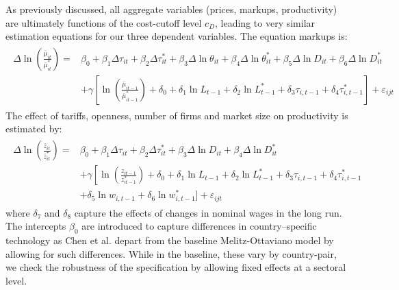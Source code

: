 \documentclass[a4paper,12pt]{article}
\begin{document}
As previously discussed, all aggregate variables (prices, markups, productivity) are ultimately functions of the cost-cutoff level $c_D$, leading to very similar estimation equations for our three dependent variables. The equation markups is:
\begin{align}
\begin{split}\label{eq:gw-estimation-markup}
\Delta \ln \left( \frac{\bar{\mu}_{it}}{\bar{\mu}_{it}^*} \right) = &\beta_0 + \beta_1 \Delta \tau_{it} + \beta_2 \Delta \tau_{it}^* + \beta_3 \Delta \ln \theta_{it} + \beta_4 \Delta \ln \theta_{it}^* + \beta_5 \Delta \ln D_{it} + \beta_6 \Delta \ln D_{it}^*\\ 
&+ \gamma \left[ \ln \left( \frac{\bar{\mu}_{it-1}}{\bar{\mu}_{it-1}^*} \right) + \delta_0 + \delta_1 \ln L_{t-1} + \delta_2\ln L_{t-1}^* + \delta_3  \tau_{i,t-1} + \delta_4  \tau_{i,t-1}^* \right] + \varepsilon_{ijt} 
\end{split}
\end{align}
The effect of tariffs, openness, number of firms and market size on productivity is estimated by:
\begin{align}
\begin{split}\label{eq:gw-estimation-productivity}
\Delta \ln \left( \frac{\bar{z}_{it}}{\bar{z}_{it}^*} \right) =&\beta_0 + \beta_1 \Delta \tau_{it} + \beta_2 \Delta \tau_{it}^*  + \beta_3 \Delta \ln D_{it} + \beta_4 \Delta \ln D_{it}^*\\
&+ \gamma \left[ \ln \left( \frac{z_{it-1}}{z_{it-1}^*} \right) + \delta_0 + \delta_1 \ln L_{t-1} + \delta_2\ln L_{t-1}^* + \delta_3  \tau_{i,t-1} + \delta_4  \tau_{i,t-1}^*  \right. \\ 
&+ \left. \delta_5 \ln w_{i,t-1} +  \delta_6 \ln w_{i,t-1}^* \bigg] \right. + \varepsilon_{ijt} 
\end{split}
\end{align}
where $\delta_7$ and $\delta_8$ capture the effects of changes in nominal wages in the long run. The intercepts $\beta_0$ are introduced to capture differences in country--specific technology as Chen et al. depart from the baseline Melitz-Ottaviano model by allowing for such differences. While in the baseline, these vary by country-pair, we check the robustness of the specification by allowing fixed effects at a sectoral level. 
\end{document}
